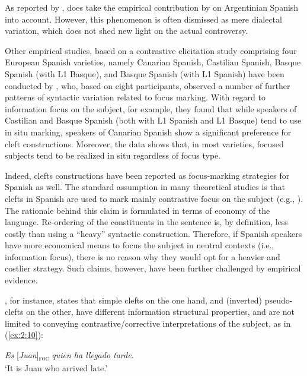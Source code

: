 As reported by \textcite{garcia2018introduction}, \textcite{zubizarreta2016nuclear} does take the empirical contribution by \textcite{gabriel2010focus} on Argentinian Spanish into account. However, this phenomenon is often dismissed as mere dialectal variation, which does not shed new light on the actual controversy.

Other empirical studies, based on a contrastive elicitation study comprising four European Spanish varieties, namely Canarian Spanish, Castilian Spanish, Basque Spanish (with L1 Basque), and Basque Spanish (with L1 Spanish) have been conducted by \textcite{del2018language}, who, based on eight participants, observed a number of further patterns of syntactic variation related to focus marking. With regard to information focus on the subject, for example, they found that while speakers of Castilian and Basque Spanish (both with L1 Spanish and L1 Basque) tend to use in situ marking, speakers of Canarian Spanish show a significant preference for cleft constructions. Moreover, the  data  shows that, in most  varieties, focused subjects tend to be realized in situ regardless of focus type. 

Indeed, clefts constructions have been reported as focus-marking strategies for Spanish as well. The standard assumption in many theoretical studies is that clefts in Spanish are used to mark mainly contrastive focus on the subject (e.g., \cite{lambrecht1996information}). The rationale behind this claim is formulated in terms of economy of the language. Re-ordering of the constituents in the sentence is, by definition, less costly than using a “heavy” syntactic construction. Therefore, if Spanish speakers have more economical means to focus the subject in neutral contexts (i.e., information focus), there is no reason why they would opt for a heavier and costlier strategy. Such claims, however, have been further challenged by empirical evidence.

\textcite{cabrera1999funciones}, for instance, states that simple clefts on the one hand, and (inverted) pseudo-clefts on the other, have different information structural properties, and are not limited to conveying contrastive/corrective interpretations of the subject, as in (\ref{ex:2:10}):

\ea \label{ex:2:10}
\textit{Es} {[\textit{Juan}]\textsubscript{\textsc{foc}}} \normalsize \textit{quien ha llegado tarde}.\\
`It is Juan who arrived late.' \hfill \parencite[4247]{cabrera1999funciones}  
\z


